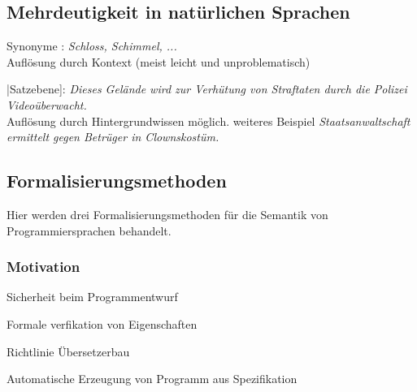 \subsection{Mehrdeutigkeit in natürlichen Sprachen}
\begin{compactitem}
	\item [Synonyme]: \emph{Schloss, Schimmel, ...}\\
	Auflösung durch Kontext (meist leicht und unproblematisch)
	\item |Satzebene]: \emph{Dieses Gelände wird zur Verhütung von Straftaten durch die Polizei Videoüberwacht.}\\
	Auflösung durch Hintergrundwissen möglich. 
	weiteres Beispiel \emph{Staatsanwaltschaft ermittelt gegen Betrüger in Clownskostüm.} 
\end{compactitem}

\subsection{Formalisierungsmethoden}
Hier werden drei Formalisierungsmethoden für die Semantik von Programmiersprachen behandelt.\\
\subsubsection*{Motivation}
\begin{compactitem}
	\item Sicherheit beim Programmentwurf\\
	\item Formale verfikation von Eigenschaften\\
	\item Richtlinie Übersetzerbau\\
	\item Automatische Erzeugung von Programm aus Spezifikation\\
\end{compactitem}

